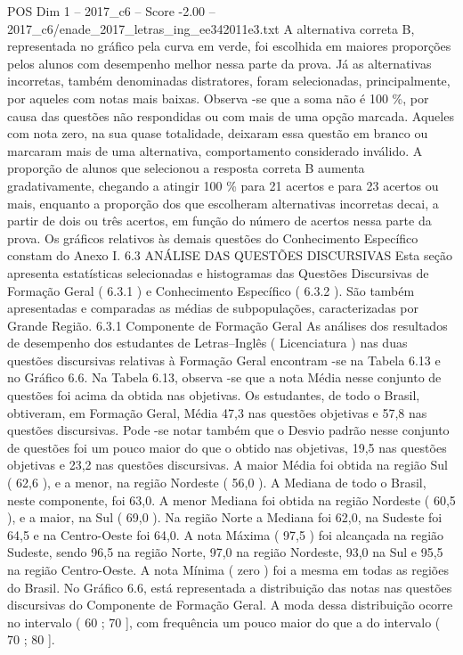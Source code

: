 \begin{textsample}{POS Dim 1 – 2017\_c6 – Score -2.00 – 2017\_c6/enade\_2017\_letras\_ing\_ee342011e3.txt}
A alternativa correta B, representada no gráfico pela curva em verde, foi escolhida em maiores proporções pelos alunos com desempenho melhor nessa parte da prova.
Já as alternativas incorretas, também denominadas distratores, foram selecionadas, principalmente, por aqueles com notas mais baixas.
Observa -se que a soma não é 100 \%, por causa das questões não respondidas ou com mais de uma opção marcada.
Aqueles com nota zero, na sua quase totalidade, deixaram essa questão em branco ou marcaram mais de uma alternativa, comportamento considerado inválido.
A proporção de alunos que selecionou a resposta correta B aumenta gradativamente, chegando a atingir 100 \% para 21 acertos e para 23 acertos ou mais, enquanto a proporção dos que escolheram alternativas incorretas decai, a partir de dois ou três acertos, em função do número de acertos nessa parte da prova.
Os gráficos relativos às demais questões do Conhecimento Específico constam do Anexo I. 6.3 ANÁLISE DAS QUESTÕES DISCURSIVAS Esta seção apresenta estatísticas selecionadas e histogramas das Questões Discursivas de Formação Geral ( 6.3.1 ) e Conhecimento Específico ( 6.3.2 ).
São também apresentadas e comparadas as médias de subpopulações, caracterizadas por Grande Região. 6.3.1 Componente de Formação Geral As análises dos resultados de desempenho dos estudantes de Letras–Inglês ( Licenciatura ) nas duas questões discursivas relativas à Formação Geral encontram -se na Tabela 6.13 e no Gráfico 6.6.
Na Tabela 6.13, observa -se que a nota Média nesse conjunto de questões foi acima da obtida nas objetivas.
Os estudantes, de todo o Brasil, obtiveram, em Formação Geral, Média 47,3 nas questões objetivas e 57,8 nas questões discursivas.
Pode -se notar também que o Desvio padrão nesse conjunto de questões foi um pouco maior do que o obtido nas objetivas, 19,5 nas questões objetivas e 23,2 nas questões discursivas.
A maior Média foi obtida na região Sul ( 62,6 ), e a menor, na região Nordeste ( 56,0 ).
A Mediana de todo o Brasil, neste componente, foi 63,0.
A menor Mediana foi obtida na região Nordeste ( 60,5 ), e a maior, na Sul ( 69,0 ).
Na região Norte a Mediana foi 62,0, na Sudeste foi 64,5 e na Centro-Oeste foi 64,0.
A nota Máxima ( 97,5 ) foi alcançada na região Sudeste, sendo 96,5 na região Norte, 97,0 na região Nordeste, 93,0 na Sul e 95,5 na região Centro-Oeste.
A nota Mínima ( zero ) foi a mesma em todas as regiões do Brasil.
No Gráfico 6.6, está representada a distribuição das notas nas questões discursivas do Componente de Formação Geral.
A moda dessa distribuição ocorre no intervalo ( 60 ; 70 ], com frequência um pouco maior do que a do intervalo ( 70 ; 80 ].

\end{textsample}
